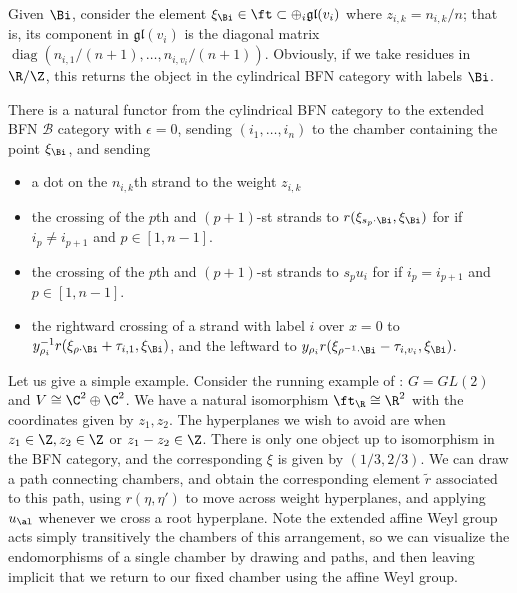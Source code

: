 Given $\Bi$, consider the element $\xi_{\Bi}\in \ft\subset \oplus_i \mathfrak{gl}(v_i)$ where $z_{i,k}=n_{i,k}/n$; that is, its component in $\mathfrak{gl}(v_i)$ is the diagonal matrix $\operatorname{diag}(n_{i,1}/(n+1),\dots, n_{i,v_i}/(n+1))$.  Obviously, if we take residues in $\R/\Z$, this returns the object in the cylindrical BFN category with labels $\Bi$.

\begin{proposition}
  There is a natural functor from the cylindrical BFN category 
to the extended BFN
  $\mathscr{B}$ category with $\epsilon=0$, sending $(i_1,\dots, i_n)$ to the chamber  containing
  the point $\xi_{\Bi}$, and sending
  \begin{itemize}
  \item a dot on the $n_{i,k}$th strand to the weight $z_{i,k}$
  \item the crossing of the $p$th and $(p+1)$-st strands to
    $r(\xi_{s_p\cdot \Bi},\xi_{\Bi})$ for if $i_p\neq i_{p+1}$ and
    $p\in [1,n-1]$.
\item the crossing of the $p$th and $(p+1)$-st strands to
    $s_pu_i$ for if $i_p= i_{p+1}$ and $p\in [1,n-1]$.
\item the rightward crossing of a strand with label $i$ over $x=0$ to
  $y_{\rho_i}^{-1}r(\xi_{\rho\cdot \Bi}+\tau_{i,1},\xi_{\Bi})$, and the
  leftward to $y_{\rho_i}r(\xi_{\rho^{-1}\cdot \Bi}-\tau_{i,v_i},\xi_{\Bi})$.
  \end{itemize}
\end{proposition}
Let us give a simple example.  Consider the running example of \cite{WebSD}: $G=GL(2)$ and $V\cong \C^2\oplus \C^2$.  We have a natural isomorphism $\ft_{\R}\cong \R^2$ with the coordinates given by $z_{1},z_{2}$.  The hyperplanes we wish to avoid are when $z_1\in \Z,z_2\in \Z$ or $z_1-z_2\in \Z$.  There is only one object up to isomorphism in the BFN category, and the corresponding $\xi$ is given by $(1/3,2/3)$.  We can draw a path connecting chambers, and obtain the corresponding element $\tilde{r}$ associated to this path, using $r(\eta,\eta')$ to move across weight hyperplanes, and applying $u_\al$ whenever we cross a root hyperplane.  Note the extended affine Weyl group acts simply transitively the chambers of this arrangement, so we can visualize the endomorphisms of a single chamber by drawing and paths, and then leaving implicit that we return to our fixed chamber using the affine Weyl group.  

